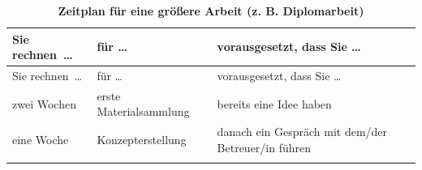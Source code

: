 \documentclass[]{book}
\theoremstyle{definition}
\theoremstyle{definition}
\theoremstyle{definition}
\theoremstyle{remark}
\begin{document}
\begin{longtable}[]{@{}lll@{}}
\caption{\textbf{\label{tab:zeitplan-gross} Zeitplan für eine größere Arbeit
(z. B. Diplomarbeit)}}\tabularnewline
\toprule
\begin{minipage}[b]{0.16\columnwidth}\raggedright\strut
Sie rechnen~\ldots{}\strut
\end{minipage} & \begin{minipage}[b]{0.35\columnwidth}\raggedright\strut
für \ldots{}\strut
\end{minipage} & \begin{minipage}[b]{0.41\columnwidth}\raggedright\strut
vorausgesetzt, dass Sie \ldots{}\strut
\end{minipage}\tabularnewline
\midrule
\endfirsthead
\toprule
\begin{minipage}[b]{0.16\columnwidth}\raggedright\strut
Sie rechnen~\ldots{}\strut
\end{minipage} & \begin{minipage}[b]{0.35\columnwidth}\raggedright\strut
für \ldots{}\strut
\end{minipage} & \begin{minipage}[b]{0.41\columnwidth}\raggedright\strut
vorausgesetzt, dass Sie \ldots{}\strut
\end{minipage}\tabularnewline
\midrule
\endhead
\begin{minipage}[t]{0.16\columnwidth}\raggedright\strut
zwei Wochen\strut
\end{minipage} & \begin{minipage}[t]{0.35\columnwidth}\raggedright\strut
erste Materialsammlung\strut
\end{minipage} & \begin{minipage}[t]{0.41\columnwidth}\raggedright\strut
bereits eine Idee haben\vspace{5mm}\strut
\end{minipage}\tabularnewline
\begin{minipage}[t]{0.16\columnwidth}\raggedright\strut
eine Woche\strut
\end{minipage} & \begin{minipage}[t]{0.35\columnwidth}\raggedright\strut
Konzepterstellung\strut
\end{minipage} & \begin{minipage}[t]{0.41\columnwidth}\raggedright\strut
danach ein Gespräch mit dem/der Betreuer/in führen\vspace{5mm}\strut
\end{minipage}\tabularnewline
\begin{minipage}[t]{0.16\columnwidth}\raggedright\strut

\end{minipage}
\end{longtable}
\end{document}

